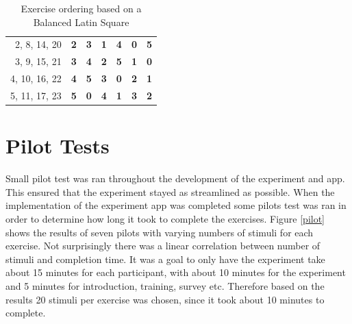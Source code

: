 \begin{table}[]
{\begin{tabular}{rcccccc}
\multicolumn{1}{r|}{2, 8, 14, 20} & \multicolumn{1}{c|}{\textbf{2}} & \multicolumn{1}{c|}{\textbf{3}} & \multicolumn{1}{c|}{\textbf{1}} & \multicolumn{1}{c|}{\textbf{4}} & \multicolumn{1}{c|}{\textbf{0}} & \multicolumn{1}{c|}{\textbf{5}} \\ \cline{2-7} 
\multicolumn{1}{r|}{3, 9, 15, 21} & \multicolumn{1}{c|}{\textbf{3}} & \multicolumn{1}{c|}{\textbf{4}} & \multicolumn{1}{c|}{\textbf{2}} & \multicolumn{1}{c|}{\textbf{5}} & \multicolumn{1}{c|}{\textbf{1}} & \multicolumn{1}{c|}{\textbf{0}} \\ \cline{2-7} 
\multicolumn{1}{r|}{4, 10, 16, 22} & \multicolumn{1}{c|}{\textbf{4}} & \multicolumn{1}{c|}{\textbf{5}} & \multicolumn{1}{c|}{\textbf{3}} & \multicolumn{1}{c|}{\textbf{0}} & \multicolumn{1}{c|}{\textbf{2}} & \multicolumn{1}{c|}{\textbf{1}} \\ \cline{2-7} 
\multicolumn{1}{r|}{5, 11, 17, 23} & \multicolumn{1}{c|}{\textbf{5}} & \multicolumn{1}{c|}{\textbf{0}} & \multicolumn{1}{c|}{\textbf{4}} & \multicolumn{1}{c|}{\textbf{1}} & \multicolumn{1}{c|}{\textbf{3}} & \multicolumn{1}{c|}{\textbf{2}} \\ \cline{2-7} 
\end{tabular}%
}
\caption{Exercise ordering based on a Balanced Latin Square}
\label{latin}
\end{table}









\section{Pilot Tests}
Small pilot test was ran throughout the development of the experiment and app. This ensured that the experiment stayed as streamlined as possible. When the implementation of the experiment app was completed some pilots test was ran in order to determine how long it took to complete the exercises. Figure \ref{pilot} shows the results of seven pilots with varying numbers of stimuli for each exercise. Not surprisingly there was a linear correlation between number of stimuli and completion time. It was a goal to only have the experiment take about 15 minutes for each participant, with about 10 minutes for the experiment and 5 minutes for introduction, training, survey etc. Therefore based on the results 20 stimuli per exercise was chosen, since it took about 10 minutes to complete.

